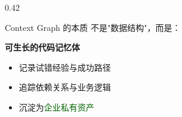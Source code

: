\documentclass[aspectratio=169,10pt]{beamer}
\begin{document}
\begin{frame}
\begin{columns}[T]
\begin{column}{0.42\textwidth}
      \vspace{0.2cm}

      \begin{block}{Context Graph 的本质}
        \footnotesize
        不是"数据结构"，而是：

        \vspace{0.2cm}

        \textbf{可生长的代码记忆体}
        \begin{itemize}
          \item 记录试错经验与成功路径
          \item 追踪依赖关系与业务逻辑
          \item 沉淀为\textcolor{darkgreen}{企业私有资产}
        \end{itemize}
      \end{block}
    \end{column}
  \end{columns}
\end{frame}
\end{document}
